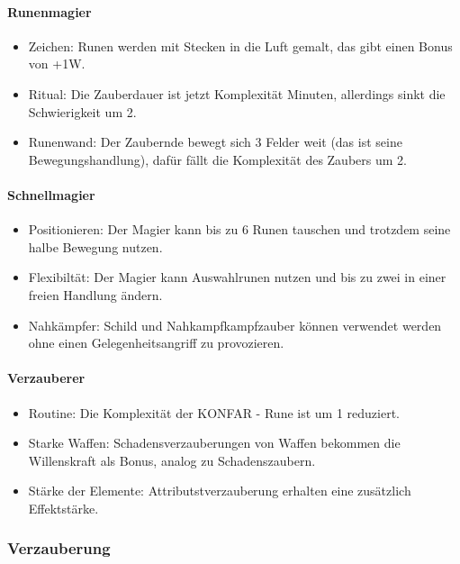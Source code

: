 \documentclass{article}
\begin{document}
\paragraph{Runenmagier}

\begin{itemize}
\item Zeichen: Runen werden mit Stecken in die Luft gemalt, das gibt einen Bonus von +1W.
\item Ritual: Die Zauberdauer ist jetzt Komplexität Minuten, allerdings sinkt die Schwierigkeit um 2.
\item Runenwand: Der Zaubernde bewegt sich 3 Felder weit (das ist seine Bewegungshandlung), dafür fällt die Komplexität des Zaubers um 2.
\end{itemize}

\paragraph{Schnellmagier}

\begin{itemize}
\item Positionieren: Der Magier kann bis zu 6 Runen tauschen und trotzdem seine halbe Bewegung nutzen.
\item Flexibiltät: Der Magier kann Auswahlrunen nutzen und bis zu zwei in einer freien Handlung ändern.
\item Nahkämpfer: Schild und Nahkampfkampfzauber können verwendet werden ohne einen Gelegenheitsangriff zu provozieren.
\end{itemize}

\paragraph{Verzauberer}

\begin{itemize}
\item Routine: Die Komplexität der KONFAR - Rune ist um 1 reduziert.
\item Starke Waffen: Schadensverzauberungen von Waffen bekommen die Willenskraft als Bonus, analog zu Schadenszaubern.
\item Stärke der Elemente: Attributstverzauberung erhalten eine zusätzlich Effektstärke.
\end{itemize}

\subsubsection{Verzauberung}
\end{document}
